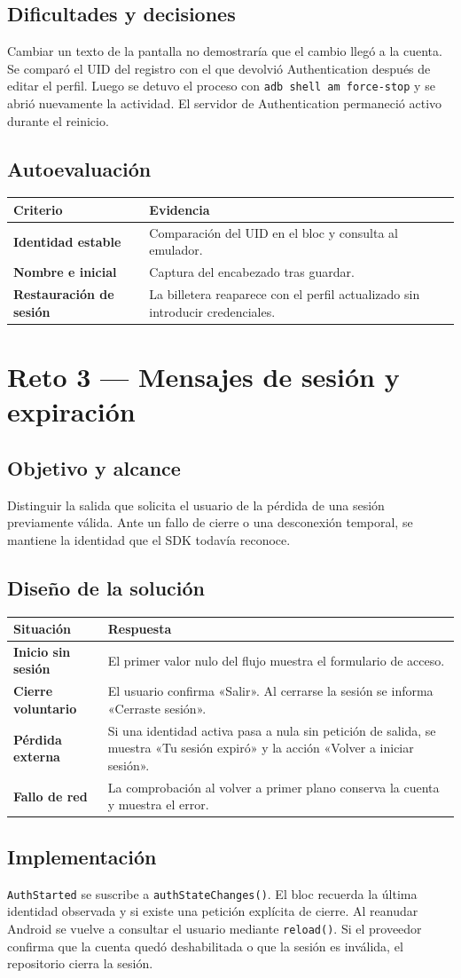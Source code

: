 \documentclass[11pt,letterpaper]{article}
\makeatletter
\newcommand{\tabla}[2]{\par\smallskip\begin{tabularx}{\linewidth}{@{}>{\bfseries\color{vino}}p{.28\linewidth}X@{}}\toprule\rowcolor{rosa}#1\\\midrule #2\bottomrule\end{tabularx}\par}
\newcommand{\ruta}[1]{\nolinkurl{#1}}
\makeatother
\begin{document}
\subsection{Dificultades y decisiones}
Cambiar un texto de la pantalla no demostraría que el cambio llegó a la cuenta. Se comparó el UID del registro con el que devolvió Authentication después de editar el perfil. Luego se detuvo el proceso con \ruta{adb shell am force-stop} y se abrió nuevamente la actividad. El servidor de Authentication permaneció activo durante el reinicio.
\subsection{Autoevaluación}
\tabla{Criterio & Evidencia}{Identidad estable & Comparación del UID en el bloc y consulta al emulador.\\Nombre e inicial & Captura del encabezado tras guardar.\\Restauración de sesión & La billetera reaparece con el perfil actualizado sin introducir credenciales.\\}
\newpage
\section{Reto 3 — Mensajes de sesión y expiración}
\subsection{Objetivo y alcance}
Distinguir la salida que solicita el usuario de la pérdida de una sesión previamente válida. Ante un fallo de cierre o una desconexión temporal, se mantiene la identidad que el SDK todavía reconoce.
\subsection{Diseño de la solución}
\tabla{Situación & Respuesta}{Inicio sin sesión & El primer valor nulo del flujo muestra el formulario de acceso.\\Cierre voluntario & El usuario confirma «Salir». Al cerrarse la sesión se informa «Cerraste sesión».\\Pérdida externa & Si una identidad activa pasa a nula sin petición de salida, se muestra «Tu sesión expiró» y la acción «Volver a iniciar sesión».\\Fallo de red & La comprobación al volver a primer plano conserva la cuenta y muestra el error.\\}
\subsection{Implementación}
\texttt{AuthStarted} se suscribe a \texttt{authStateChanges()}. El bloc recuerda la última identidad observada y si existe una petición explícita de cierre. Al reanudar Android se vuelve a consultar el usuario mediante \texttt{reload()}. Si el proveedor confirma que la cuenta quedó deshabilitada o que la sesión es inválida, el repositorio cierra la sesión.
\end{document}
